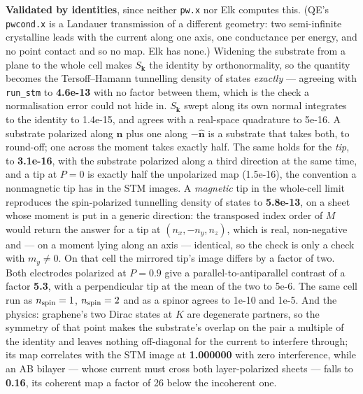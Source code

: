 \documentclass[11pt,a4paper]{article}
\newcommand{\code}[1]{\texttt{\small #1}}
\begin{document}
\textbf{Validated by identities}, since neither \code{pw.x} nor Elk computes
this. (QE's \code{pwcond.x} is a Landauer transmission of a different geometry:
two semi-infinite crystalline leads with the current along one axis, one
conductance per energy, and no point contact and so no map. Elk has none.) Widening the substrate from a plane to the whole cell makes
$S_{\mathbf k}$ the identity by orthonormality, so the quantity becomes the
Tersoff--Hamann tunnelling density of states \emph{exactly} --- agreeing with
\code{run\_stm} to \textbf{4.6e-13} with no factor between them, which is the
check a normalisation error could not hide in. $S_{\mathbf k}$ swept along its
own normal integrates to the identity to 1.4e-15, and agrees with a real-space
quadrature to 5e-16. A substrate polarized along $\hat{\mathbf n}$ plus one
along $-\hat{\mathbf n}$ is a substrate that takes both, to round-off; one
across the moment takes exactly half. The same holds for the \emph{tip}, to
\textbf{3.1e-16}, with the substrate polarized along a third direction at the
same time, and a tip at $P=0$ is exactly half the unpolarized map (1.5e-16), the
convention a nonmagnetic tip has in the STM images. A \emph{magnetic} tip in the
whole-cell limit reproduces the spin-polarized tunnelling density of states to
\textbf{5.8e-13}, on a sheet whose moment is put in a generic direction: the
transposed index order of $M$ would return the answer for a tip at
$(n_x, -n_y, n_z)$, which is real, non-negative and --- on a moment lying along
an axis --- identical, so the check is only a check with $m_y \ne 0$. On that
cell the mirrored tip's image differs by a factor of two. Both electrodes
polarized at $P = 0.9$ give a parallel-to-antiparallel contrast of a factor
\textbf{5.3}, with a perpendicular tip at the mean of the two to 5e-6. The same cell run as $n_{\rm spin}=1$,
$n_{\rm spin}=2$ and as a spinor agrees to 1e-10 and 1e-5. And the physics:
graphene's two Dirac states at $K$ are degenerate partners, so the symmetry of
that point makes the substrate's overlap on the pair a multiple of the identity
and leaves nothing off-diagonal for the current to interfere through; its map
correlates with the STM image at \textbf{1.000000} with zero interference, while
an AB bilayer --- whose current must cross both layer-polarized sheets --- falls
to \textbf{0.16}, its coherent map a factor of 26 below the incoherent one.
\end{document}
